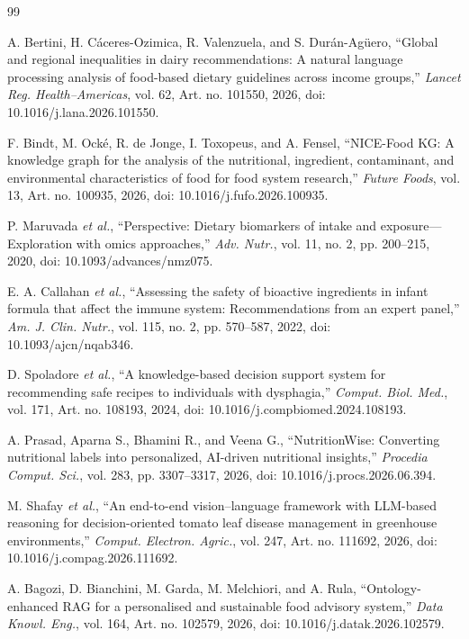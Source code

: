 \documentclass[conference]{IEEEtran}
\begin{document}
\begin{thebibliography}{99}

 A. Bertini, H. Cáceres-Ozimica, R. Valenzuela, and S. Durán-Agüero, ``Global and regional inequalities in dairy recommendations: A natural language processing analysis of food-based dietary guidelines across income groups,'' \emph{Lancet Reg. Health--Americas}, vol. 62, Art. no. 101550, 2026, doi: 10.1016/j.lana.2026.101550.

 F. Bindt, M. Ocké, R. de Jonge, I. Toxopeus, and A. Fensel, ``NICE-Food KG: A knowledge graph for the analysis of the nutritional, ingredient, contaminant, and environmental characteristics of food for food system research,'' \emph{Future Foods}, vol. 13, Art. no. 100935, 2026, doi: 10.1016/j.fufo.2026.100935.

 P. Maruvada \emph{et al.}, ``Perspective: Dietary biomarkers of intake and exposure---Exploration with omics approaches,'' \emph{Adv. Nutr.}, vol. 11, no. 2, pp. 200--215, 2020, doi: 10.1093/advances/nmz075.

 E. A. Callahan \emph{et al.}, ``Assessing the safety of bioactive ingredients in infant formula that affect the immune system: Recommendations from an expert panel,'' \emph{Am. J. Clin. Nutr.}, vol. 115, no. 2, pp. 570--587, 2022, doi: 10.1093/ajcn/nqab346.

 D. Spoladore \emph{et al.}, ``A knowledge-based decision support system for recommending safe recipes to individuals with dysphagia,'' \emph{Comput. Biol. Med.}, vol. 171, Art. no. 108193, 2024, doi: 10.1016/j.compbiomed.2024.108193.

 A. Prasad, Aparna S., Bhamini R., and Veena G., ``NutritionWise: Converting nutritional labels into personalized, AI-driven nutritional insights,'' \emph{Procedia Comput. Sci.}, vol. 283, pp. 3307--3317, 2026, doi: 10.1016/j.procs.2026.06.394.

 M. Shafay \emph{et al.}, ``An end-to-end vision--language framework with LLM-based reasoning for decision-oriented tomato leaf disease management in greenhouse environments,'' \emph{Comput. Electron. Agric.}, vol. 247, Art. no. 111692, 2026, doi: 10.1016/j.compag.2026.111692.

 A. Bagozi, D. Bianchini, M. Garda, M. Melchiori, and A. Rula, ``Ontology-enhanced RAG for a personalised and sustainable food advisory system,'' \emph{Data Knowl. Eng.}, vol. 164, Art. no. 102579, 2026, doi: 10.1016/j.datak.2026.102579.


\end{thebibliography}
\end{document}
